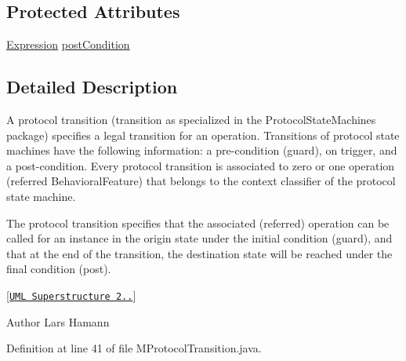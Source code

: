 \subsection*{Protected Attributes}
\begin{DoxyCompactItemize}
\item 
\hyperlink{classorg_1_1tzi_1_1use_1_1uml_1_1ocl_1_1expr_1_1_expression}{Expression} \hyperlink{classorg_1_1tzi_1_1use_1_1uml_1_1mm_1_1statemachines_1_1_m_protocol_transition_a12977e947ecdba7ff8881e4f61904b0d}{post\-Condition}
\end{DoxyCompactItemize}


\subsection{Detailed Description}
A protocol transition (transition as specialized in the Protocol\-State\-Machines package) specifies a legal transition for an operation. Transitions of protocol state machines have the following information\-: a pre-\/condition (guard), on trigger, and a post-\/condition. Every protocol transition is associated to zero or one operation (referred Behavioral\-Feature) that belongs to the context classifier of the protocol state machine. 

The protocol transition specifies that the associated (referred) operation can be called for an instance in the origin state under the initial condition (guard), and that at the end of the transition, the destination state will be reached under the final condition (post). 

\mbox{[}\href{http://www.omg.org/spec/UML/}{\tt U\-M\-L Superstructure 2..}\mbox{]}

\begin{DoxyAuthor}{Author}
Lars Hamann 
\end{DoxyAuthor}


Definition at line 41 of file M\-Protocol\-Transition.\-java.



